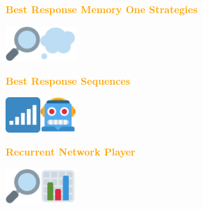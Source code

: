 \documentclass{beamer}
\begin{document}
\begin{frame}
    \begin{center}
    \textcolor{orange}{\large{\textbf{Best Response Memory One Strategies}}} \vspace{1cm}

    \includegraphics[width=0.10\textwidth]{static/look.png}\hspace{2pt}\includegraphics[width=0.10\textwidth]{static/memone.png}
    \end{center}
\end{frame}


\begin{frame}
    \begin{center}
    \textcolor{orange}{\large{\textbf{Best Response Sequences}}} \vspace{1cm}

    \includegraphics[width=0.10\textwidth]{static/sequence.png}\hspace{2pt}\includegraphics[width=0.10\textwidth]{static/lstm.png}
    \end{center}
\end{frame}


\begin{frame}
    \begin{center}
        \textcolor{orange}{\large{\textbf{Recurrent Network Player}}} \vspace{1cm}
    
        \includegraphics[width=0.10\textwidth]{static/look.png}\hspace{2pt}\includegraphics[width=0.10\textwidth]{static/bar.png}
    \end{center}
\end{frame}
\end{document}
